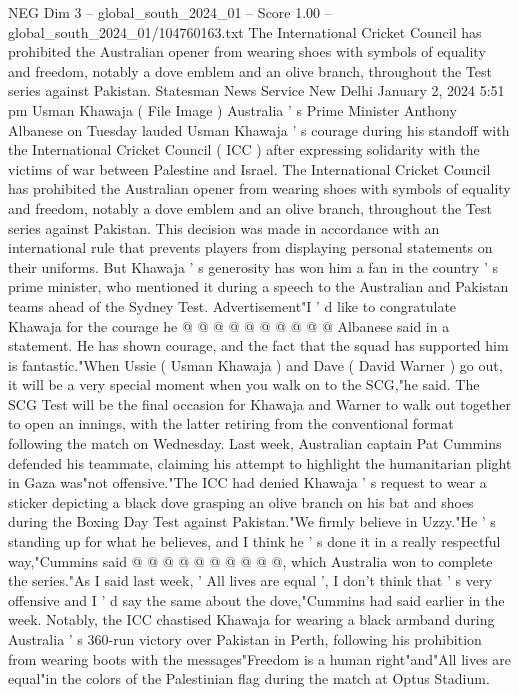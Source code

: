 \begin{textsample}{NEG Dim 3 – global\_south\_2024\_01 – Score 1.00 – global\_south\_2024\_01/104760163.txt}  \label{ex:f3_neg_103}
The International Cricket Council has prohibited the Australian opener from wearing shoes with symbols of equality and freedom, notably a dove emblem and an olive branch, throughout the Test series against Pakistan.
Statesman News Service New Delhi January 2, 2024 5:51 pm Usman Khawaja ( File Image ) Australia ' s Prime Minister Anthony Albanese on Tuesday lauded Usman Khawaja ' s courage during his standoff with the International Cricket Council ( ICC ) after expressing solidarity with the victims of war between Palestine and Israel.
The International Cricket Council has prohibited the Australian opener from wearing shoes with symbols of equality and freedom, notably a dove emblem and an olive branch, throughout the Test series against Pakistan.
This decision was made in accordance with an international rule that prevents players from displaying personal statements on their uniforms.
But Khawaja ' s generosity has won him a fan in the country ' s prime minister, who mentioned it during a speech to the Australian and Pakistan teams ahead of the Sydney Test.
Advertisement"I ' d like to congratulate Khawaja for the courage he @ @ @ @ @ @ @ @ @ @ Albanese said in a statement.
He has shown courage, and the fact that the squad has supported him is fantastic."When Ussie ( Usman Khawaja ) and Dave ( David Warner ) go out, it will be a very special moment when you walk on to the SCG,"he said.
The SCG Test will be the final occasion for Khawaja and Warner to walk out together to open an innings, with the latter retiring from the conventional format following the match on Wednesday.
Last week, Australian captain Pat Cummins defended his teammate, claiming his attempt to highlight the humanitarian plight in Gaza was"not offensive."The ICC had denied Khawaja ' s request to wear a sticker depicting a black dove grasping an olive branch on his bat and shoes during the Boxing Day Test against Pakistan."We firmly believe in Uzzy."He ' s standing up for what he believes, and I think he ' s done it in a really respectful way,"Cummins said @ @ @ @ @ @ @ @ @ @, which Australia won to complete the series."As I said last week, ' All lives are equal ', I don't think that ' s very offensive and I ' d say the same about the dove,"Cummins had said earlier in the week.
Notably, the ICC chastised Khawaja for wearing a black armband during Australia ' s 360-run victory over Pakistan in Perth, following his prohibition from wearing boots with the messages"Freedom is a human right"and"All lives are equal"in the colors of the Palestinian flag during the match at Optus Stadium.

\end{textsample}
